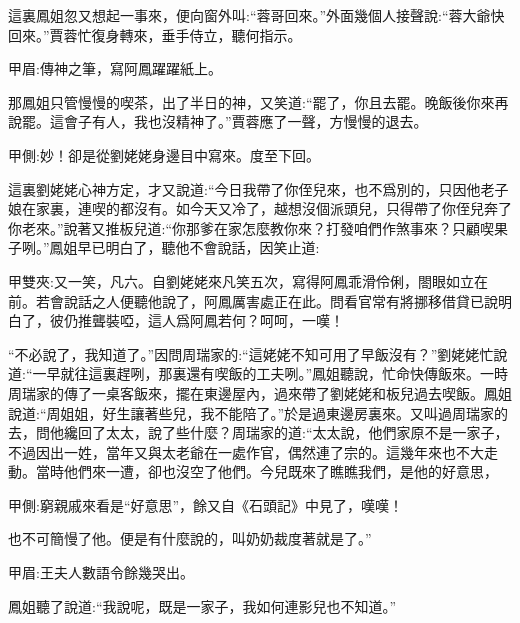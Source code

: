 \begin{parag}
    這裏鳳姐忽又想起一事來，便向窗外叫:“蓉哥回來。”外面幾個人接聲說:“蓉大爺快回來。”賈蓉忙復身轉來，垂手侍立，聽何指示。\begin{note}甲眉:傳神之筆，寫阿鳳躍躍紙上。\end{note}那鳳姐只管慢慢的喫茶，出了半日的神，又笑道:“罷了，你且去罷。晚飯後你來再說罷。這會子有人，我也沒精神了。”賈蓉應了一聲，方慢慢的退去。\begin{note}甲側:妙！卻是從劉姥姥身邊目中寫來。度至下回。\end{note}
\end{parag}


\begin{parag}
    這裏劉姥姥心神方定，才又說道:“今日我帶了你侄兒來，也不爲別的，只因他老子娘在家裏，連喫的都沒有。如今天又冷了，越想沒個派頭兒，只得帶了你侄兒奔了你老來。”說著又推板兒道:“你那爹在家怎麼教你來？打發咱們作煞事來？只顧喫果子咧。”鳳姐早已明白了，聽他不會說話，因笑止道:\begin{note}甲雙夾:又一笑，凡六。自劉姥姥來凡笑五次，寫得阿鳳乖滑伶俐，閤眼如立在前。若會說話之人便聽他說了，阿鳳厲害處正在此。問看官常有將挪移借貸已說明白了，彼仍推聾裝啞，這人爲阿鳳若何？呵呵，一嘆！\end{note}“不必說了，我知道了。”因問周瑞家的:“這姥姥不知可用了早飯沒有？”劉姥姥忙說道:“一早就往這裏趕咧，那裏還有喫飯的工夫咧。”鳳姐聽說，忙命快傳飯來。一時周瑞家的傳了一桌客飯來，擺在東邊屋內，過來帶了劉姥姥和板兒過去喫飯。鳳姐說道:“周姐姐，好生讓著些兒，我不能陪了。”於是過東邊房裏來。又叫過周瑞家的去，問他纔回了太太，說了些什麼？周瑞家的道:“太太說，他們家原不是一家子，不過因出一姓，當年又與太老爺在一處作官，偶然連了宗的。這幾年來也不大走動。當時他們來一遭，卻也沒空了他們。今兒既來了瞧瞧我們，是他的好意思，\begin{note}甲側:窮親戚來看是“好意思”，餘又自《石頭記》中見了，嘆嘆！\end{note}也不可簡慢了他。便是有什麼說的，叫奶奶裁度著就是了。”\begin{note}甲眉:王夫人數語令餘幾哭出。\end{note}鳳姐聽了說道:“我說呢，既是一家子，我如何連影兒也不知道。”
\end{parag}


